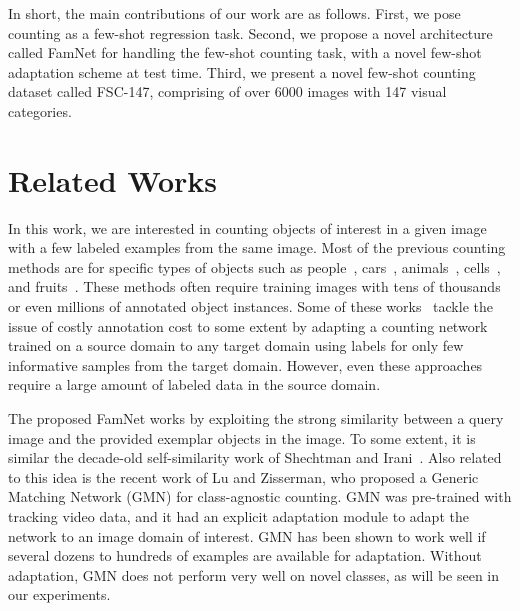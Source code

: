 In short, the main contributions of our work are as follows. First, we pose counting as a few-shot regression task. Second, we propose a novel architecture called FamNet for handling the few-shot counting task, with a novel few-shot adaptation scheme at test time. Third, we present a novel few-shot counting dataset called FSC-147, comprising of over 6000 images with 147 visual categories.

 

\section{Related Works}
In this work, we are interested in counting objects of interest in a given image with a few labeled examples from the same image. Most of the previous counting methods are for specific types of objects such as people~\cite{ma2019bayesian,zhang2016single,ranjan2018iterative,babu2018divide,sam2017switching,li2018csrnet,liu2018leveraging,cao2018scale,ranjan2019crowd,shi2019revisiting,liu2019context,wang2019learning,zhang2019attentional,wan2019adaptive,m_Ranjan-etal-ACCV20,m_Abousamra-etal-AAAI21}, cars~\cite{mundhenk2016large}, animals~\cite{arteta2016counting}, cells~\cite{arteta2016detecting,xie2018microscopy,khan2016deep}, and fruits~\cite{rahnemoonfar2017deep}. These methods often require training images with tens of thousands or even millions of annotated object instances. Some of these works~\cite{m_Ranjan-etal-ACCV20} tackle the issue of costly annotation cost to some extent by adapting a counting network trained on a source domain to any target domain using labels for only few informative samples from the target domain. However, even these approaches require a large amount of labeled data in the source domain.  

The proposed FamNet works by exploiting the strong similarity between a query image and the provided exemplar objects in the image. To some extent, it is similar the decade-old self-similarity work of Shechtman and Irani~\cite{Shechtman-Irani-CVPR07}. Also related to this idea is the recent work of Lu and Zisserman\cite{lu2018class}, who proposed a Generic Matching Network (GMN) for class-agnostic counting. GMN was pre-trained with tracking video data, and it had an explicit adaptation module to adapt the network to an image domain of interest. GMN has been shown to work well if several dozens to hundreds of examples are available for adaptation. Without adaptation, GMN does not perform very well on novel classes, as will be seen in our experiments. 

